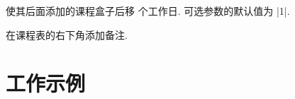 \documentclass[svgnames]{l3doc}
\begin{document}
\begin{documentation}
\begin{function}{\newday}
  \begin{syntax}
     
  \end{syntax}
  使其后面添加的课程盒子后移  个工作日.
  可选参数的默认值为 |1|.
\end{function}

\begin{function}{\more}
  \begin{syntax}
     
  \end{syntax}
  在课程表的右下角添加备注.
\end{function}

\appendix \linespread{1.25}

\section{工作示例} \label{mwe}





\end{documentation}


\PrintIndex
\end{document}
